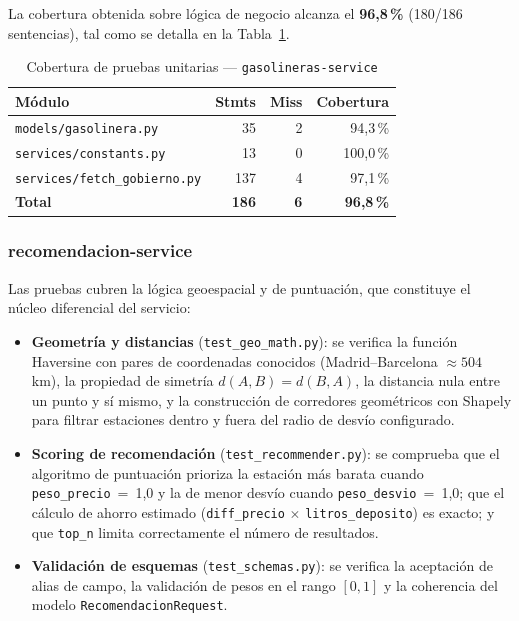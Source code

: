 La cobertura obtenida sobre lógica de negocio alcanza el \textbf{96,8\,\%} (180/186 sentencias),
tal como se detalla en la Tabla~\ref{tab:coverage-gasolineras}.

\begin{table}[H]
  \centering
  \caption{Cobertura de pruebas unitarias — \texttt{gasolineras-service}}
  \label{tab:coverage-gasolineras}
  \begin{tabular}{lrrr}
    \toprule
    \textbf{Módulo}                      & \textbf{Stmts} & \textbf{Miss} & \textbf{Cobertura} \\
    \midrule
    \texttt{models/gasolinera.py}        & 35             & 2             & 94,3\,\%           \\
    \texttt{services/constants.py}       & 13             & 0             & 100,0\,\%          \\
    \texttt{services/fetch\_gobierno.py} & 137            & 4             & 97,1\,\%           \\
    \midrule
    \textbf{Total}                       & \textbf{186}   & \textbf{6}    & \textbf{96,8\,\%}  \\
    \bottomrule
  \end{tabular}
\end{table}

\subsubsection{recomendacion-service}

Las pruebas cubren la lógica geoespacial y de puntuación, que constituye el núcleo diferencial
del servicio:

\begin{itemize}
  \item \textbf{Geometría y distancias} (\texttt{test\_geo\_math.py}): se verifica la función
        Haversine con pares de coordenadas conocidos (Madrid--Barcelona $\approx 504$\,km), la
        propiedad de simetría $d(A,B)=d(B,A)$, la distancia nula entre un punto y sí mismo, y la
        construcción de corredores geométricos con Shapely para filtrar estaciones dentro y fuera
        del radio de desvío configurado.

  \item \textbf{Scoring de recomendación} (\texttt{test\_recommender.py}): se comprueba que
        el algoritmo de puntuación prioriza la estación más barata cuando
        \texttt{peso\_precio}~=~1,0 y la de menor desvío cuando \texttt{peso\_desvio}~=~1,0; que
        el cálculo de ahorro estimado (\texttt{diff\_precio} $\times$ \texttt{litros\_deposito})
        es exacto; y que \texttt{top\_n} limita correctamente el número de resultados.

  \item \textbf{Validación de esquemas} (\texttt{test\_schemas.py}): se verifica la
        aceptación de alias de campo, la validación de pesos en el rango $[0,1]$ y la coherencia
        del modelo \texttt{RecomendacionRequest}.
\end{itemize}

